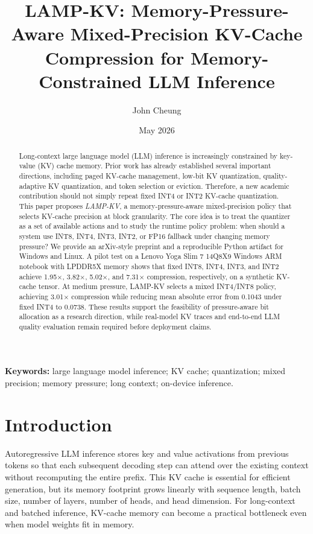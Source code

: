 \documentclass[11pt]{article}
\title{LAMP-KV: Memory-Pressure-Aware Mixed-Precision KV-Cache Compression for Memory-Constrained LLM Inference}
\author{John Cheung}
\affil{College of Professional and Continued Education}
\date{May 2026}
\begin{document}
\maketitle

\begin{abstract}
Long-context large language model (LLM) inference is increasingly constrained by key-value (KV) cache memory. Prior work has already established several important directions, including paged KV-cache management, low-bit KV quantization, quality-adaptive KV quantization, and token selection or eviction. Therefore, a new academic contribution should not simply repeat fixed INT4 or INT2 KV-cache quantization. This paper proposes \emph{LAMP-KV}, a memory-pressure-aware mixed-precision policy that selects KV-cache precision at block granularity. The core idea is to treat the quantizer as a set of available actions and to study the runtime policy problem: when should a system use INT8, INT4, INT3, INT2, or FP16 fallback under changing memory pressure? We provide an arXiv-style preprint and a reproducible Python artifact for Windows and Linux. A pilot test on a Lenovo Yoga Slim 7 14Q8X9 Windows ARM notebook with LPDDR5X memory shows that fixed INT8, INT4, INT3, and INT2 achieve 1.95$\times$, 3.82$\times$, 5.02$\times$, and 7.31$\times$ compression, respectively, on a synthetic KV-cache tensor. At medium pressure, LAMP-KV selects a mixed INT4/INT8 policy, achieving 3.01$\times$ compression while reducing mean absolute error from 0.1043 under fixed INT4 to 0.0738. These results support the feasibility of pressure-aware bit allocation as a research direction, while real-model KV traces and end-to-end LLM quality evaluation remain required before deployment claims.
\end{abstract}

\noindent\textbf{Keywords:} large language model inference; KV cache; quantization; mixed precision; memory pressure; long context; on-device inference.

\section{Introduction}
Autoregressive LLM inference stores key and value activations from previous tokens so that each subsequent decoding step can attend over the existing context without recomputing the entire prefix. This KV cache is essential for efficient generation, but its memory footprint grows linearly with sequence length, batch size, number of layers, number of heads, and head dimension. For long-context and batched inference, KV-cache memory can become a practical bottleneck even when model weights fit in memory.
\end{document}
